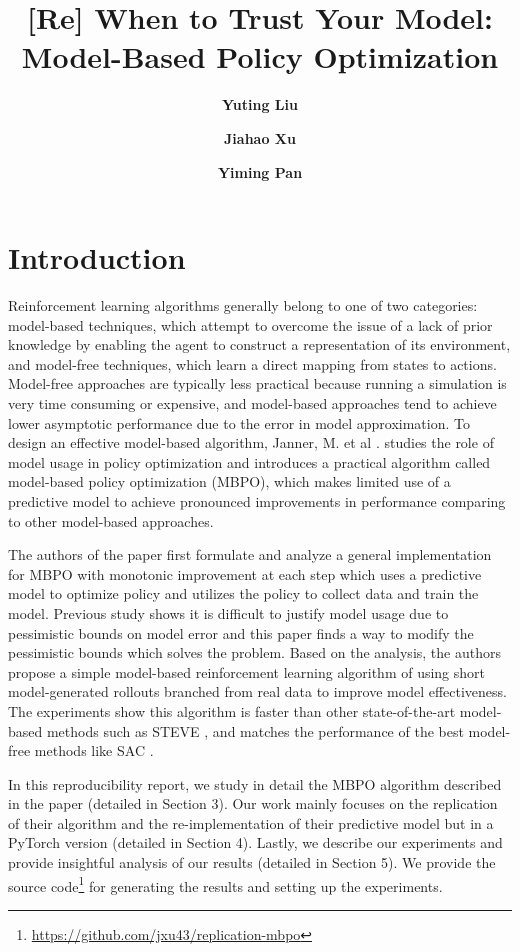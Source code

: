 \documentclass{article}
\title{[Re] When to Trust Your Model: Model-Based Policy Optimization}
\author[]{\textbf{Yuting Liu}}
\author[]{\textbf{Jiahao Xu}}
\author[]{\textbf{Yiming Pan}}
\affil{Department of Computer Science, Brown University}
\affil{\{yuting\_liu, jiahao\_xu, yiming\_pan\}@brown.edu}
\begin{document}

\maketitle
\section{Introduction}

Reinforcement learning algorithms generally belong to one of two categories: model-based techniques, which attempt to overcome the issue of a lack of prior knowledge by enabling the agent to construct a representation of its environment, and model-free techniques, which learn a direct mapping from states to actions. Model-free approaches are typically less practical because running a simulation is very time consuming or expensive, and model-based approaches tend to achieve lower asymptotic performance due to the error in model approximation. To design an effective model-based algorithm, Janner, M. et al \cite{janner2019trust}. studies the role of model usage in policy optimization and introduces a practical algorithm called model-based policy optimization (MBPO), which makes limited use of a predictive model to achieve pronounced improvements in performance comparing to other model-based approaches.

The authors of the paper \cite{janner2019trust} first formulate and analyze a general implementation for MBPO with monotonic improvement at each step which uses a predictive model to optimize policy and utilizes the policy to collect data and train the model. Previous study shows it is difficult to justify model usage due to pessimistic bounds on model error and this paper finds a way to modify the pessimistic bounds which solves the problem. Based on the analysis, the authors propose a simple model-based reinforcement learning algorithm of using short model-generated rollouts branched from real data to improve model effectiveness. The experiments show this algorithm is faster than other state-of-the-art model-based methods such as STEVE \cite{NIPS2018_8044}, and matches the performance of the best model-free methods like SAC \cite{haarnoja2018soft}.

In this reproducibility report, we study in detail the MBPO algorithm described in the paper (detailed in Section 3). Our work mainly focuses on the replication of their algorithm and the re-implementation of their predictive model but in a PyTorch version (detailed in Section 4). Lastly, we describe our experiments and provide insightful analysis of our results (detailed in Section 5). We provide the source code\footnote{\url{https://github.com/jxu43/replication-mbpo}} for generating the results and setting up the experiments.
\end{document}
